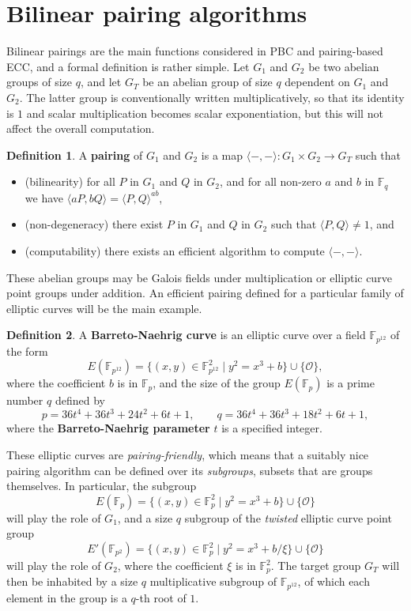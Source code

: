 \documentclass{article}
\theoremstyle{definition}
\newtheorem{definition}{Definition}
\newcommand{\F}{\mathbb{F}}
\renewcommand{\O}{\mathcal{O}}
\begin{document}
\section{Bilinear pairing algorithms}

Bilinear pairings are the main functions considered in PBC and pairing-based ECC, and a formal definition is rather simple. Let $ G_1 $ and $ G_2 $ be two abelian groups of size $ q $, and let $ G_T $ be an abelian group of size $ q $ dependent on $ G_1 $ and $ G_2 $. The latter group is conventionally written multiplicatively, so that its identity is $ 1 $ and scalar multiplication becomes scalar exponentiation, but this will not affect the overall computation.

\begin{definition}
A \textbf{pairing} of $ G_1 $ and $ G_2 $ is a map $ \langle -, - \rangle : G_1 \times G_2 \to G_T $ such that
\begin{itemize}
\item (bilinearity) for all $ P $ in $ G_1 $ and $ Q $ in $ G_2 $, and for all non-zero $ a $ and $ b $ in $ \F_q $ we have $ \langle aP, bQ \rangle = \langle P, Q \rangle^{ab} $,
\item (non-degeneracy) there exist $ P $ in $ G_1 $ and $ Q $ in $ G_2 $ such that $ \langle P, Q \rangle \ne 1 $, and
\item (computability) there exists an efficient algorithm to compute $ \langle -, - \rangle $.
\end{itemize}
\end{definition}

These abelian groups may be Galois fields under multiplication or elliptic curve point groups under addition. An efficient pairing defined for a particular family of elliptic curves will be the main example.

\begin{definition}
A \textbf{Barreto-Naehrig curve} is an elliptic curve over a field $ \F_{p^{12}} $ of the form
$$ E(\F_{p^{12}}) = \{ (x, y) \in \F_{p^{12}}^2 \mid y^2 = x^3 + b \} \cup \{ \O \}, $$
where the coefficient $ b $ is in $ \F_p $, and the size of the group $ E(\F_p) $ is a prime number $ q $ defined by
$$ p = 36t^4 + 36t^3 + 24t^2 + 6t + 1, \qquad q = 36t^4 + 36t^3 + 18t^2 + 6t + 1, $$
where the \textbf{Barreto-Naehrig parameter} $ t $ is a specified integer.
\end{definition}

These elliptic curves are \emph{pairing-friendly}, which means that a suitably nice pairing algorithm can be defined over its \emph{subgroups}, subsets that are groups themselves. In particular, the subgroup
$$ E(\F_p) = \{ (x, y) \in \F_p^2 \mid y^2 = x^3 + b \} \cup \{ \O \} $$
will play the role of $ G_1 $, and a size $ q $ subgroup of the \emph{twisted} elliptic curve point group
$$ E'(\F_{p^2}) = \{ (x, y) \in \F_p^2 \mid y^2 = x^3 + b / \xi \} \cup \{ \O \} $$
will play the role of $ G_2 $, where the coefficient $ \xi $ is in $ \F_p^2 $. The target group $ G_T $ will then be inhabited by a size $ q $ multiplicative subgroup of $ \F_{p^{12}} $, of which each element in the group is a $ q $-th root of $ 1 $.
\end{document}
